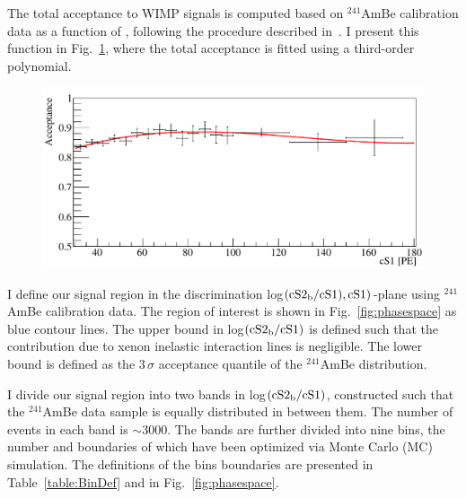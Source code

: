 The total acceptance to WIMP signals is computed based on $^{241}$AmBe calibration data as a function of \cSi, following the procedure described in~\cite{Aprile:2012vw}. I present this function in Fig.~\ref{fig:Acc}, where the total acceptance is fitted using a third-order polynomial.

\begin{figure}[t!]
\begin{minipage}{0.9\linewidth}
\centerline{\includegraphics[width=1.\linewidth]{fig/Acceptance.pdf}}
\end{minipage}
\label{fig:Acc}
\end{figure}

I define our signal region in the discrimination log$(\mathrm{cS2}_\mathrm{b}{}/\mathrm{cS1}),\mathrm{cS1})$-plane using $^{241}$AmBe calibration data. 
The region of interest is shown in Fig.~\ref{fig:phasespace} as blue contour lines. The upper bound in log$(\mathrm{cS2}_\mathrm{b}/\mathrm{cS1})$ is defined such that the contribution due to xenon inelastic interaction lines is negligible. The lower bound is defined as the 3\,$\sigma$ acceptance quantile of the $^{241}$AmBe distribution.

I divide our signal region into two bands in log$(\mathrm{cS2}_\mathrm{b}/\mathrm{cS1})$, constructed such that the $^{241}$AmBe data sample is equally distributed in between them. The number of events in each band is $\sim3000$. The bands are further divided into nine bins, the number and boundaries of which have been optimized via Monte Carlo (MC) simulation. The definitions of the bins boundaries are presented in Table~\ref{table:BinDef} and in Fig.~\ref{fig:phasespace}. 

